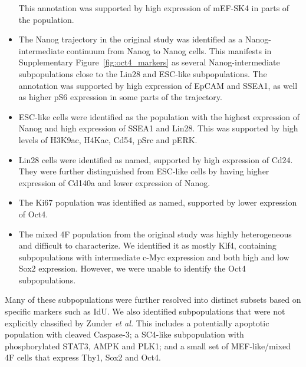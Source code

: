\documentclass{article}
\begin{document}
\begin{itemize}
        This annotation was supported by high expression of mEF-SK4 in parts of the population.
    \item The Nanog\hi{} trajectory in the original study was identified as a Nanog-intermediate continuum from Nanog\lo{} to Nanog\hi{} cells.
        This manifests in Supplementary Figure~\ref{fig:oct4_markers} as several Nanog-intermediate subpopulations close to the Lin28\hi{} and ESC-like subpopulations.
        The annotation was supported by high expression of EpCAM and SSEA1, as well as higher pS6 expression in some parts of the trajectory.
    \item ESC-like cells were identified as the population with the highest expression of Nanog and high expression of SSEA1 and Lin28.
        This was supported by high levels of H3K9ac, H4Kac, Cd54, pSrc and pERK.
    \item Lin28\hi{} cells were identified as named, supported by high expression of Cd24.
They were further distinguished from ESC-like cells by having higher expression of Cd140a and lower expression of Nanog.
    \item The Ki67\hi{} population was identified as named, supported by lower expression of Oct4.
    \item The mixed 4F population from the original study was highly heterogeneous and difficult to characterize.
We identified it as mostly Klf4\lo{}, containing subpopulations with intermediate c-Myc expression and both high and low Sox2 expression.
However, we were unable to identify the Oct4\lo{} subpopulations.
\end{itemize}
Many of these subpopulations were further resolved into distinct subsets based on specific markers such as IdU.
We also identified subpopulations that were not explicitly classified by Zunder \emph{et al.}
This includes a potentially apoptotic population with cleaved Caspase-3;
    a SC4-like subpopulation with phosphorylated STAT3, AMPK and PLK1;
    and a small set of MEF-like/mixed 4F cells that express Thy1, Sox2 and Oct4.


\newpage
\end{document}
